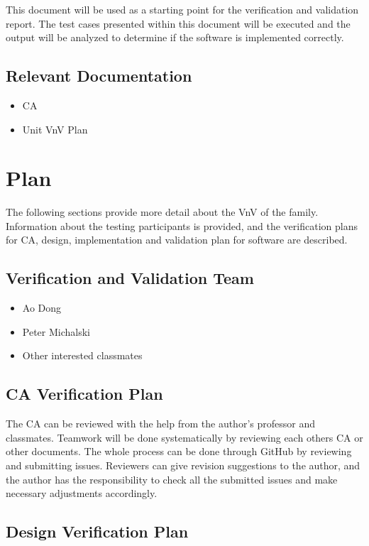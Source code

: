 \documentclass[12pt, titlepage]{article}
\begin{document}
This document will be used as a starting point for the verification and validation report.
The test cases presented within this document will be executed and the output will be analyzed to determine if the software is implemented correctly.

\subsection{Relevant Documentation}

\begin{itemize}
    \item CA
    \item Unit VnV Plan
\end{itemize}

\section{Plan}
\label{sec_plan}
	The following sections provide more detail about the VnV of the \progname{} family. Information about the testing participants is provided, and the verification plans for CA, design, implementation and validation plan for software are described.
\subsection{Verification and Validation Team}

\begin{itemize}
    \item Ao Dong
    \item Peter Michalski
    \item Other interested classmates
\end{itemize}

\subsection{CA Verification Plan}

The CA can be reviewed with the help from the author's professor and classmates. Teamwork will be done systematically by reviewing each others CA or other documents. The whole process can be done through GitHub by reviewing and submitting issues. Reviewers can give revision suggestions to the author, and the author has the responsibility to check all the submitted issues and make necessary adjustments accordingly.

\subsection{Design Verification Plan}
\end{document}
